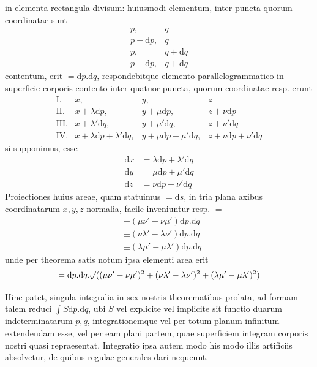 in elementa rectangula divisum: huiusmodi elementum, inter puncta quorum coordinatae sunt
\[
\begin{array}{ll}
p,&q\\
p+\mathrm{d}p,&q\\
p,&q+\mathrm{d}q\\
p+\mathrm{d}p,&q+\mathrm{d}q
\end{array}
\]
contentum, erit $=\mathrm{d}p.\mathrm{d}q$, respondebitque elemento parallelogrammatico in superficie corporis contento inter quatuor puncta, quorum coordinatae resp. erunt
\[
\begin{array}{rlll}
\mathrm{I.}&x,&y,&z\\
\mathrm{II.}&x+\lambda\mathrm{d}p,&y+\mu\mathrm{d}p,&z+\nu\mathrm{d}p\\
\mathrm{III.}&x+\lambda'\mathrm{d}q,&y+\mu'\mathrm{d}q,&z+\nu'\mathrm{d}q\\
\mathrm{IV.}&x+\lambda\mathrm{d}p+\lambda'\mathrm{d}q,&y+\mu\mathrm{d}p+\mu'\mathrm{d}q,&z+\nu\mathrm{d}p+\nu'\mathrm{d}q
\end{array}
\]
si supponimus, esse
\[
\begin{aligned}
\mathrm{d}x&=\lambda\mathrm{d}p+\lambda'\mathrm{d}q\\
\mathrm{d}y&=\mu\mathrm{d}p+\mu'\mathrm{d}q\\
\mathrm{d}z&=\nu\mathrm{d}p+\nu'\mathrm{d}q
\end{aligned}
\]
Proiectiones huius areae, quam statuimus $=\mathrm{d}s$, in tria plana axibus coordinatarum $x,y,z$ normalia, facile inveniuntur resp. $=$
\[
\begin{aligned}
&\pm(\mu\nu'-\nu\mu')\mathrm{d}p.\mathrm{d}q\\
&\pm(\nu\lambda'-\lambda\nu')\mathrm{d}p.\mathrm{d}q\\
&\pm(\lambda\mu'-\mu\lambda')\mathrm{d}p.\mathrm{d}q
\end{aligned}
\]
unde per theorema satis notum ipsa elementi area erit
\[
=\mathrm{d}p.\mathrm{d}q.\mathord{{}^{}\!\surd}((\mu\nu'-\nu\mu')^2+(\nu\lambda'-\lambda\nu')^2+(\lambda\mu'-\mu\lambda')^2)
\]
\par\endgroup
\par
Hinc patet, singula integralia in sex nostris theorematibus prolata, ad formam talem reduci $\int S\mathrm{d}p.\mathrm{d}q$, ubi $S$ vel explicite vel implicite sit functio duarum indeterminatarum $p,q$, integrationemque vel per totum planum infinitum extendendam esse, vel per eam plani partem, quae superficiem integram corporis nostri quasi repraesentat. Integratio ipsa autem modo his modo illis artificiis absolvetur, de quibus regulae generales dari nequeunt.
